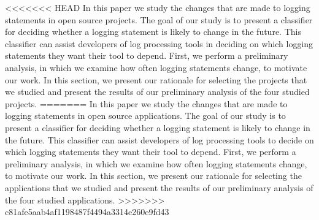 <<<<<<< HEAD
In this paper we study the changes that are made to logging statements in open source projects. The goal of our study is to present a classifier for deciding whether a logging statement is likely to change in the future. This classifier can assist developers of log processing tools in deciding on which logging statements they want their tool to depend. %
First, we perform a preliminary analysis, in which we examine how often logging statements change, to motivate our work. In this section, we present our rationale for selecting the projects that we studied and present the results of our preliminary analysis of the four studied projects. 
=======
In this paper we study the changes that are made to logging statements  in open source applications. The goal of our study is to present a classifier for deciding whether a logging statement is likely to change in the future. This classifier can assist developers of log processing tools to decide on which logging statements they want their tool to depend. %
First, we perform a preliminary analysis, in which we examine how often logging statements change, to motivate our work. In this section, we present our rationale for selecting the applications that we studied and present the results of our preliminary analysis of the four studied applications. 
>>>>>>> c81afe5aab4af1198487f4494a3314e260e9fd43

